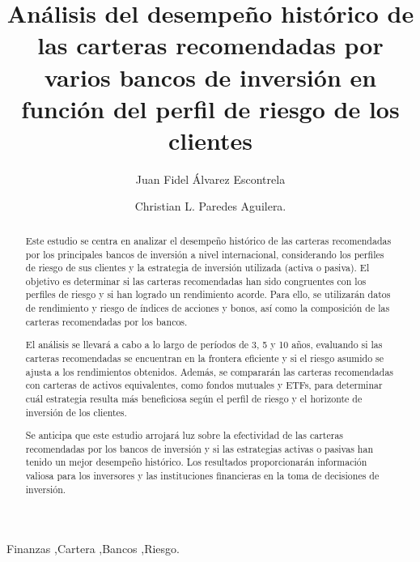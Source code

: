 \documentclass{class/cas-sc}
\begin{document}
\begin{frontmatter}

\title{Análisis del desempeño histórico de las carteras recomendadas por varios bancos de inversión en función del perfil de riesgo de los clientes}

\author{Juan Fidel Álvarez Escontrela }

\author{Christian L. Paredes Aguilera.}



\begin{abstract}
    Este estudio se centra en analizar el desempeño histórico de las carteras recomendadas por los principales bancos de inversión a nivel internacional, considerando los perfiles de riesgo de sus clientes y la estrategia de inversión utilizada (activa o pasiva). El objetivo es determinar si las carteras recomendadas han sido congruentes con los perfiles de riesgo y si han logrado un rendimiento acorde. Para ello, se utilizarán datos de rendimiento y riesgo de índices de acciones y bonos, así como la composición de las carteras recomendadas por los bancos.

El análisis se llevará a cabo a lo largo de períodos de 3, 5 y 10 años, evaluando si las carteras recomendadas se encuentran en la frontera eficiente y si el riesgo asumido se ajusta a los rendimientos obtenidos. Además, se compararán las carteras recomendadas con carteras de activos equivalentes, como fondos mutuales y ETFs, para determinar cuál estrategia resulta más beneficiosa según el perfil de riesgo y el horizonte de inversión de los clientes.

Se anticipa que este estudio arrojará luz sobre la efectividad de las carteras recomendadas por los bancos de inversión y si las estrategias activas o pasivas han tenido un mejor desempeño histórico. Los resultados proporcionarán información valiosa para los inversores y las instituciones financieras en la toma de decisiones de inversión.
\end{abstract}

\begin{keyword}
    Finanzas \sep Cartera \sep Bancos \sep Riesgo.
\end{keyword}


\end{frontmatter}







\end{document}
